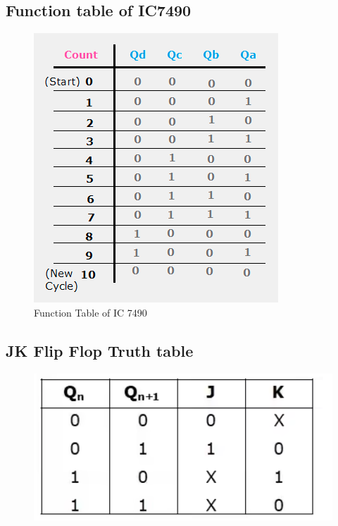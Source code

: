 \documentclass[11pt]{article}
\begin{document}
\subsection{Function table of IC7490}
\begin{figure}[H]
	\centering
	\includegraphics[scale = 0.85]{function table of 7490.png}
	\caption{Function Table of IC 7490}
\end{figure}



\subsection{JK Flip Flop Truth table}
\begin{figure}[H]
	\centering
	\includegraphics[scale = 0.5]{jk flip flop truth table.png}
\end{figure}
\end{document}
